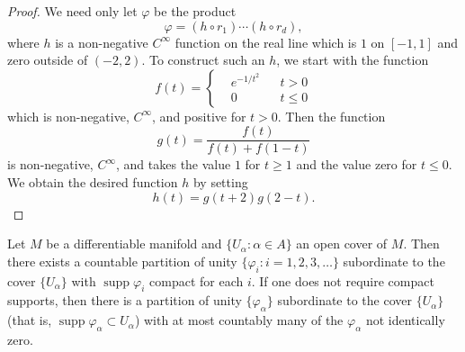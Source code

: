 \begin{proof}
	We need only let $\varphi$ be the product
	\begin{equation}
		\label{eq:1.10:1}
		\varphi=(h\circ r_{1})\cdots(h\circ r_{d}),
	\end{equation}
	where $h$ is a non-negative $C^{\infty}$ function on the real line which is $1$
	on $[-1,1]$ and zero outside of $(-2,2)$. To construct such an $h$, we
	start with the function
	\begin{equation}
		\label{eq:1.10:2}
		f(t)=\left\{\begin{aligned}{}&{{}e^{-1/t^{2}}}&{}&{{}t>0}\\ {}&{{}0}&{}&{{}t\leq0}\end{aligned}\right.
	\end{equation}
	which is non-negative, $C^{\infty}$, and positive for $t>0$. Then the function
	\begin{equation}
		\label{eq:1.10:3}
		g(t)=\frac{f(t)}{f(t)+f(1-t)}
	\end{equation}
	is non-negative, $C^\infty$, and takes the value $1$ for $t \geq 1$ and
	the value zero for $t \leq 0$. We obtain the desired function $h$ by setting
	\begin{equation}
		\label{eq:1.10:4}
		h(t)=g(t+2)g(2-t).
	\end{equation}
\end{proof}

\begin{theorem}\label{thm:1.11}
	Let $M$ be a differentiable manifold and
	$\{U_\alpha: \alpha \in A\}$ an open cover of $M$. Then there exists a
	countable partition of unity $\{\varphi_i: i = 1, 2, 3, \ldots\}$
	subordinate to the cover $\{U_\alpha\}$ with $\operatorname{supp} \varphi_i$
	compact for each $i$. If one does not require compact supports,
	then there is a partition of unity $\{\varphi_\alpha\}$ subordinate to
	the cover $\{U_\alpha\}$ (that is, $\operatorname{supp} \varphi_\alpha \subset U_\alpha$)
	with at most countably many of the $\varphi_\alpha$ not identically zero.

\end{theorem}

